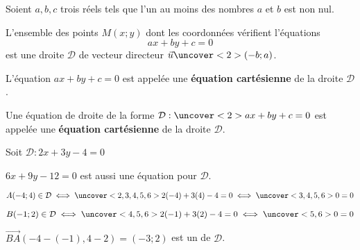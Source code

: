 \documentclass{beamer}
\begin{document}
   \begin{frame}
    
      
   \begin{theorem}

    Soient $a,b,c$ trois réels tels que l'un au moins des nombres $a$ et $b$ est non nul.
    
    L'ensemble des points $M(x;y)$ dont les coordonnées vérifient l'équations
    $$ax+by+c=0$$ est une droite $\mathcal{D}$ de vecteur directeur $\vec{u}\uncover<2>{(-b;a)}$.
    
    L'équation $ax+by+c=0$ est appelée une \textbf{équation cartésienne} de la droite $\mathcal{D}$.
   
   \end{theorem}

  \end{frame}
   
   \begin{frame}
     \begin{definition}
   
   Une équation de droite de la forme $\mathcal{D}:\uncover<2>{ax+by+c=0}$ est appelée une \textbf{équation cartésienne} de la droite $\mathcal{D}$.
   \end{definition}
   \end{frame}

  
       \begin{frame}
    
   \begin{example}
    Soit $\mathcal{D}:2 x+3 y-4=0$
   
   $6x+9y-12=0$ est aussi une équation pour $\mathcal{D}$.
   
   $A(-4;4) \in \mathcal{D} \iff \uncover<2,3,4,5,6>{2(-4)+3(4)-4=0} \iff \uncover<3,4,5,6>{0=0}$
   
   
   $B(-1;2) \in \mathcal{D} \iff \uncover<4,5,6>{2(-1)+3(2)-4=0} \iff \uncover<5,6>{0=0}$
   
  
   $\vec{BA}(-4-(-1),4-2)=(-3;2)$ est un  de $\mathcal{D}$.
   \end{example}
   
   \end{frame}
  
\end{document}
